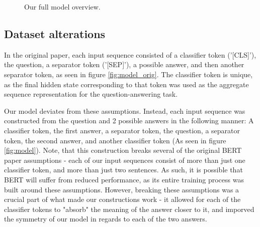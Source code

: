 \documentclass{article}
\begin{document}
\begin{figure}[h]
\begin{center}
{
		}
	\end{center}
	\caption{Our full model overview.}
	\label{fig:full_model_overview}
\end{figure}

\subsection{Dataset alterations}

In the original paper, each input sequence consisted of a classifier token ('[CLS]'), the question, a separator token ('[SEP]'), a possible answer, and then another separator token, as seen in figure \ref{fig:model_orig}. The classifier token is unique, as the final hidden state corresponding to that token was used as the aggregate sequence representation for the question-answering task.



Our model deviates from these assumptions. Instead, each input sequence was constructed from the question and 2 possible answers in the following manner: A classifier token, the first answer, a separator token, the question, a separator token, the second answer, and another classifier token (As seen in figure \ref{fig:model}). Note, that this construction breaks several of the original BERT paper assumptions - each of our input sequences consist of more than just one classifier token, and more than just two sentences. As such, it is possible that BERT will suffer from reduced performance, as its entire training process was built around these assumptions.
However, breaking these assumptions was a crucial part of what made our constructions work - it allowed for each of the classifier tokens to "absorb" the meaning of the answer closer to it, and imporved the symmetry of our model in regards to each of the two answers.
\end{document}
